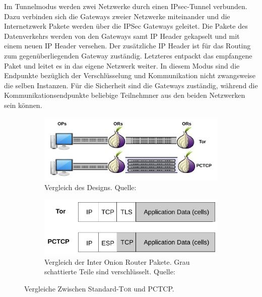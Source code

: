 \documentclass[fleqn,envcountsame,runningheads,10pt,a4paper]{llncs}
\begin{document}
Im Tunnelmodus werden zwei Netzwerke durch einen IPsec-Tunnel verbunden. Dazu verbinden sich die Gateways zweier Netzwerke miteinander und die Internetzwerk Pakete werden über die IPSec Gateways geleitet. Die Pakete des Datenverkehrs werden von den Gateways samt IP Header gekapselt und mit einem neuen IP Header versehen. Der zusätzliche IP Header ist für das Routing zum gegenüberliegenden Gateway zuständig. Letzteres entpackt das empfangene Paket und leitet es in das eigene Netzwerk weiter. In diesem Modus sind die Endpunkte bezüglich der Verschlüsselung und Kommunikation nicht zwangsweise die selben Instanzen. Für die Sicherheit sind die Gateways zuständig, während die Kommunikationsendpunkte beliebige Teilnehmner aus den beiden Netzwerken sein können.

\begin{figure}[h]
  \begin{center}
    \begin{subfigure}[t]{0.46\textwidth}
      \includegraphics[width=\textwidth]{pics/PCTCP_design.pdf}
      \caption{Vergleich des Designs. Quelle: \cite{pctcp}}
      \label{fig:pctcpdesign}
    \end{subfigure}
    \begin{subfigure}[t]{0.46\textwidth}
      \includegraphics[width=\textwidth]{pics/PCTCP_header.pdf}
      \caption{Vergleich der Inter Onion Router Pakete. Grau schattierte Teile sind verschlüsselt. Quelle:\cite{pctcp}}
      \label{fig:pctcpheader}
    \end{subfigure}
    \caption{Vergleiche Zwischen Standard-\textsc{Tor} und PCTCP.}
  \end{center} 
\end{figure}
\end{document}
